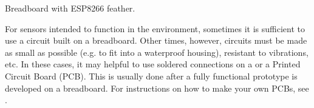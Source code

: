 %


\begin{marginfigure}[-2cm]
	\caption[ESP8266 feather microcontroller on breadboard]{Breadboard with ESP8266 feather.}
\end{marginfigure}

%

\begin{kaobox}[frametitle=Board with circuit design \dots]
	For sensors intended to function in the environment, sometimes it is sufficient to use a circuit built on a breadboard. 
	Other times, however, circuits must be made as small as possible (e.g. to fit into a waterproof housing), resistant to vibrations, etc.
	In these cases, it may helpful to use soldered connections on a  or a Printed Circuit Board (PCB). 
	This is usually done after a fully functional prototype is developed on a breadboard.
	For instructions on how to make your own PCBs, see .
\end{kaobox}%

